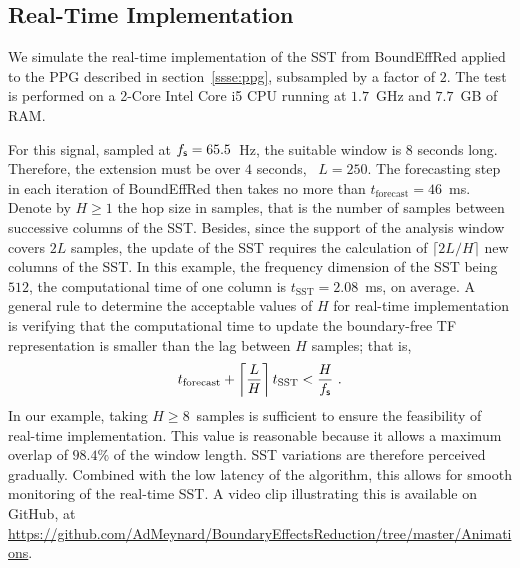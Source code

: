 \subsection{Real-Time Implementation}
We simulate the real-time implementation of the SST from {\sf BoundEffRed} applied to the PPG described in section~\ref{ssse:ppg}, subsampled by a factor of $2$. The test is performed on a 2-Core Intel Core i5 CPU running at $1.7$~GHz and $7.7$~GB of RAM. 

For this signal, sampled at $f_{\mathsf s}=65.5$~Hz, the suitable window is $8$ seconds long. Therefore, the extension must be over $4$ seconds, \ie~$L=250$. The forecasting step in each iteration of {\sf BoundEffRed} then takes no more than $t_{\mathrm{forecast}}=46$~ms. Denote by $H\geq 1$ the hop size in samples, that is the number of samples between successive columns of the SST. Besides, since the support of the analysis window covers $2L$ samples, the update of the SST requires the calculation of $\lceil 2L/H \rceil$ new columns of the SST. In this example, the frequency dimension of the SST being $512$, the computational time of one column is $t_{\mathrm{SST}}=2.08$~ms, on average. A general rule to determine the acceptable values of $H$ for real-time implementation is verifying that the computational time to update the boundary-free TF representation is smaller than the lag between $H$ samples; that is,
\[
t_{\mathrm{forecast}} + \left\lceil \frac{L}H \right\rceil t_{\mathrm{SST}} < \frac{H}\fs\ . 
\]
In our example, taking $H\geq 8$~samples is sufficient to ensure the feasibility of real-time implementation. This value is reasonable because it allows a maximum overlap of $98.4\%$ of the window length. SST variations are therefore perceived gradually. Combined with the low latency of the algorithm, this allows for smooth monitoring of the real-time SST. A video clip illustrating this is available on GitHub, at \url{https://github.com/AdMeynard/BoundaryEffectsReduction/tree/master/Animations}. 